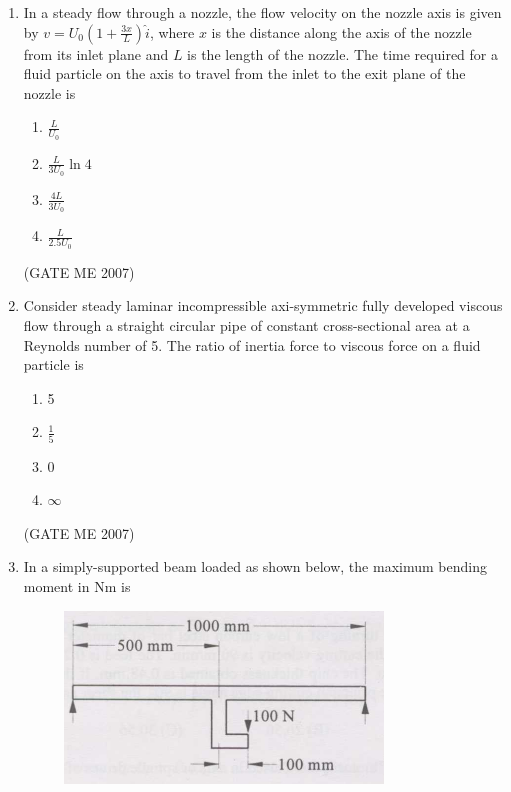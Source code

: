 \documentclass[journal]{IEEEtran}
\begin{document}
\begin{enumerate}
\item In a steady flow through a nozzle, the flow velocity on the nozzle axis is given by \( v = U_0(1 + \frac{3x}{L}) \hat{i} \), where \( x \) is the distance along the axis of the nozzle from its inlet plane and \( L \) is the length of the nozzle. The time required for a fluid particle on the axis to travel from the inlet to the exit plane of the nozzle is
\begin{multicols}{4}
\begin{enumerate}
\item \( \frac{L}{U_0} \)
\item \( \frac{L}{3U_0} \ln 4 \)
\item \( \frac{4L}{3U_0} \)
\item \( \frac{L}{2.5U_0} \)
\end{enumerate}
\end{multicols}
\hfill (GATE ME 2007)

\item Consider steady laminar incompressible axi-symmetric fully developed viscous flow through a straight circular pipe of constant cross-sectional area at a Reynolds number of 5. The ratio of inertia force to viscous force on a fluid particle is
\begin{multicols}{4}
\begin{enumerate}
\item 5
\item \( \frac{1}{5} \)
\item 0
\item \( \infty \)
\end{enumerate}
\end{multicols}
\hfill (GATE ME 2007)

\item In a simply-supported beam loaded as shown below, the maximum bending moment in Nm is

\begin{figure}[H]
    \centering
    \includegraphics[width=0.8\textwidth]{Fig 1.png}
    \caption{}
    \label{fig:question10}
\end{figure}


\end{enumerate}
\end{document}

